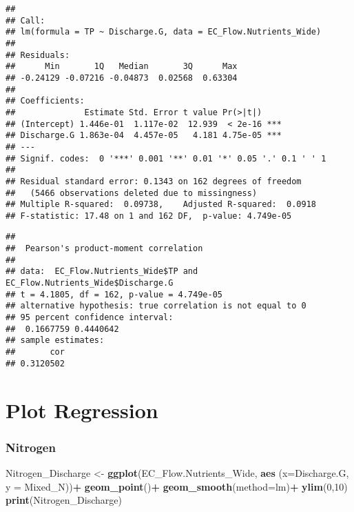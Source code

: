 \documentclass[]{article}
\newenvironment{Shaded}{\begin{snugshade}}{\end{snugshade}}
\newcommand{\CommentTok}[1]{\textcolor[rgb]{0.56,0.35,0.01}{\textit{#1}}}
\newcommand{\DataTypeTok}[1]{\textcolor[rgb]{0.13,0.29,0.53}{#1}}
\newcommand{\DecValTok}[1]{\textcolor[rgb]{0.00,0.00,0.81}{#1}}
\newcommand{\KeywordTok}[1]{\textcolor[rgb]{0.13,0.29,0.53}{\textbf{#1}}}
\newcommand{\NormalTok}[1]{#1}
\newcommand{\OperatorTok}[1]{\textcolor[rgb]{0.81,0.36,0.00}{\textbf{#1}}}
\newcommand{\StringTok}[1]{\textcolor[rgb]{0.31,0.60,0.02}{#1}}
\begin{document}
\begin{verbatim}
## 
## Call:
## lm(formula = TP ~ Discharge.G, data = EC_Flow.Nutrients_Wide)
## 
## Residuals:
##      Min       1Q   Median       3Q      Max 
## -0.24129 -0.07216 -0.04873  0.02568  0.63304 
## 
## Coefficients:
##              Estimate Std. Error t value Pr(>|t|)    
## (Intercept) 1.446e-01  1.117e-02  12.939  < 2e-16 ***
## Discharge.G 1.863e-04  4.457e-05   4.181 4.75e-05 ***
## ---
## Signif. codes:  0 '***' 0.001 '**' 0.01 '*' 0.05 '.' 0.1 ' ' 1
## 
## Residual standard error: 0.1343 on 162 degrees of freedom
##   (5466 observations deleted due to missingness)
## Multiple R-squared:  0.09738,    Adjusted R-squared:  0.0918 
## F-statistic: 17.48 on 1 and 162 DF,  p-value: 4.749e-05
\end{verbatim}

\begin{Shaded}
\end{Shaded}

\begin{verbatim}
## 
##  Pearson's product-moment correlation
## 
## data:  EC_Flow.Nutrients_Wide$TP and EC_Flow.Nutrients_Wide$Discharge.G
## t = 4.1805, df = 162, p-value = 4.749e-05
## alternative hypothesis: true correlation is not equal to 0
## 95 percent confidence interval:
##  0.1667759 0.4440642
## sample estimates:
##       cor 
## 0.3120502
\end{verbatim}

\hypertarget{plot-regression}{%
\section{Plot Regression}\label{plot-regression}}

\hypertarget{nitrogen-2}{%
\subsubsection{Nitrogen}\label{nitrogen-2}}

\begin{Shaded}
\begin{Highlighting}[]
\NormalTok{Nitrogen_Discharge <-}\StringTok{ }
\StringTok{  }\KeywordTok{ggplot}\NormalTok{(EC_Flow.Nutrients_Wide, }\KeywordTok{aes}\NormalTok{ (}\DataTypeTok{x=}\NormalTok{Discharge.G, }\DataTypeTok{y =}\NormalTok{ Mixed_N))}\OperatorTok{+}
\StringTok{  }\KeywordTok{geom_point}\NormalTok{()}\OperatorTok{+}
\StringTok{  }\KeywordTok{geom_smooth}\NormalTok{(}\DataTypeTok{method=}\NormalTok{lm)}\OperatorTok{+}
\StringTok{  }\KeywordTok{ylim}\NormalTok{(}\DecValTok{0}\NormalTok{,}\DecValTok{10}\NormalTok{)}
\KeywordTok{print}\NormalTok{(Nitrogen_Discharge)}
\end{Highlighting}
\end{Shaded}
\end{document}
